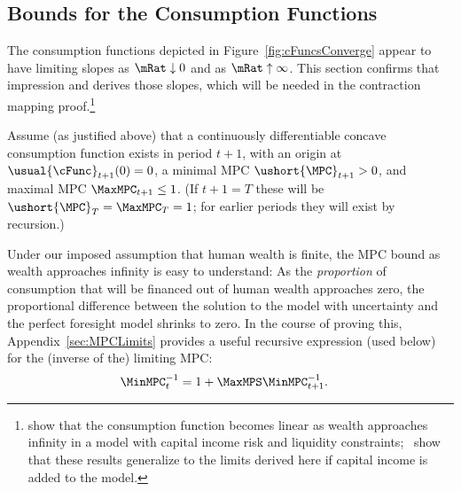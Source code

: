 \documentclass[BufferStockTheory]{subfiles}
\begin{document}
\hypertarget{Bounds-for-the-Consumption-Functions}{}
\subsection{Bounds for the Consumption Functions}\label{subsec:cFuncBounds}

The consumption functions depicted in Figure~\ref{fig:cFuncsConverge} appear to have limiting slopes as $\mRat \downarrow 0$ and as $\mRat \uparrow \infty$.  This section confirms that impression and derives those slopes, which will be needed in the contraction mapping proof.\footnote{\cite{benhabibWealth} show that the consumption function becomes linear as wealth approaches infinity in a model with capital income risk and liquidity constraints;~\cite{maTodaRich} show that these results generalize to the limits derived here if capital income is added to the model.}

\newcommand{\NewMaxMinMPC}{\ushort{\MPC}}

Assume (as justified above) that a continuously differentiable concave consumption function exists in period $t+1$, with an origin at $\usual{\cFunc}_{t+1}(0)=0$, a minimal MPC $\NewMaxMinMPC_{t+1}>0$, and maximal MPC $\MaxMPC_{t+1} \leq 1$.  (If $t+1 = T$ these will be $\NewMaxMinMPC_{T}=\MaxMPC_{T}=1$; for earlier periods they will exist by recursion.)

Under our imposed assumption that human wealth is finite, the MPC bound as wealth approaches infinity is easy to understand:  As the \textit{proportion} of consumption that will be financed out of human wealth approaches zero, the proportional difference between the solution to the model with uncertainty and the perfect foresight model shrinks to zero.  \hypertarget{MPCnvrsLower}{} In the course of proving this, Appendix~\ref{sec:MPCLimits} provides a useful recursive expression (used below) for the (inverse of the) limiting MPC:\hypertarget{WRICCond}{}
\begin{align}
  \MinMPC_{t}^{-1}  & = 1+\MaxMPS \MinMPC_{t+1}^{-1} \label{eq:MinMPCInv}.
\end{align}
\end{document}
